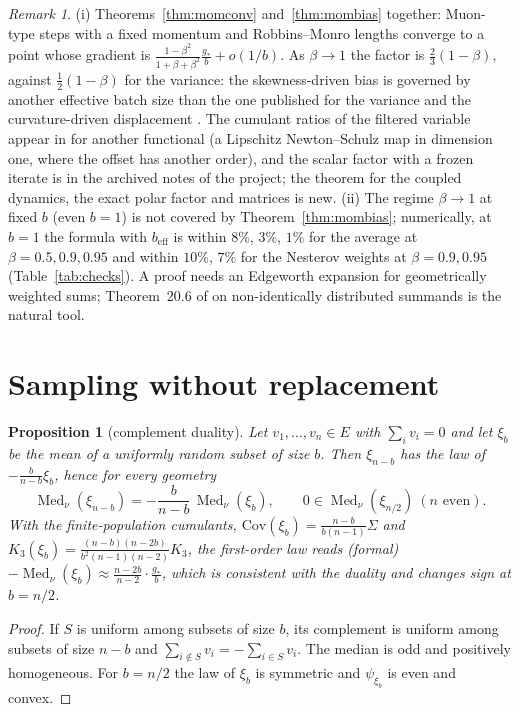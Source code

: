 \documentclass[10pt]{article}
\newtheorem{proposition}[theorem]{Proposition}
\theoremstyle{definition}
\theoremstyle{remark}
\newtheorem{remark}[theorem]{Remark}
\newcommand{\Med}{\operatorname{Med}}
\begin{document}
\begin{remark}\label{rem:mom}
(i) Theorems~\ref{thm:momconv} and~\ref{thm:mombias} together: Muon-type steps with a fixed momentum and Robbins--Monro
lengths converge to a point whose gradient is $\frac{1-\beta^2}{1+\beta+\beta^2}\frac{g_\ast}b+o(1/b)$. As
$\beta\to1$ the factor is $\frac23(1-\beta)$, against $\frac12(1-\beta)$ for the variance: the skewness-driven bias is
governed by another effective batch size than the one published for the variance and the curvature-driven displacement
\cite{paquette,chen}. The cumulant ratios of the filtered variable appear in \cite[Prop.~6.11]{ddj} for another
functional (a Lipschitz Newton--Schulz map in dimension one, where the offset has another order), and the scalar factor
with a frozen iterate is in the archived notes of the project; the theorem for the coupled dynamics, the exact polar
factor and matrices is new. (ii) The regime $\beta\to1$ at fixed $b$ (even $b=1$) is not covered by
Theorem~\ref{thm:mombias}; numerically, at $b=1$ the formula with $b_{\mathrm{eff}}$ is within $8\%$, $3\%$, $1\%$ for the
average at $\beta=0.5,0.9,0.95$ and within $10\%$, $7\%$ for the Nesterov weights at $\beta=0.9,0.95$
(Table~\ref{tab:checks}). A proof needs an Edgeworth expansion for
geometrically weighted sums; Theorem~20.6 of \cite{br} on non-identically distributed summands is the natural tool.
\end{remark}

\section{Sampling without replacement}\label{sec:wor}

\begin{proposition}[complement duality]\label{prop:wor}
Let $v_1,\dots,v_n\in E$ with $\sum_iv_i=0$ and let $\xi_b$ be the mean of a uniformly random subset of size $b$. Then
$\xi_{n-b}$ has the law of $-\frac b{n-b}\xi_b$, hence for every geometry
\[
\Med_\nu(\xi_{n-b})=-\frac b{n-b}\,\Med_\nu(\xi_b),\qquad 0\in\Med_\nu(\xi_{n/2})\ (n\text{ even}).
\]
With the finite-population cumulants, $\mathrm{Cov}(\xi_b)=\frac{n-b}{b(n-1)}\Sigma$ and
$K_3(\xi_b)=\frac{(n-b)(n-2b)}{b^2(n-1)(n-2)}K_3$, the first-order law reads \emph{(formal)}
$-\Med_\nu(\xi_b)\approx\frac{n-2b}{n-2}\cdot\frac{g_\ast}b$, which is consistent with the duality and changes sign at $b=n/2$.
\end{proposition}
\begin{proof}
If $S$ is uniform among subsets of size $b$, its complement is uniform among subsets of size $n-b$ and
$\sum_{i\notin S}v_i=-\sum_{i\in S}v_i$. The median is odd and positively homogeneous. For $b=n/2$ the law of $\xi_b$ is
symmetric and $\psi_{\xi_b}$ is even and convex.
\end{proof}
\end{document}
